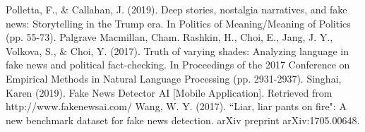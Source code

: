 \documentclass[12pt, final]{article}
\begin{document}
\begin{thebibliography}{1}
     Polletta, F., \& Callahan, J. (2019). Deep stories, nostalgia narratives, and fake news: Storytelling in the Trump era. In Politics of Meaning/Meaning of Politics (pp. 55-73). Palgrave Macmillan, Cham.
     Rashkin, H., Choi, E., Jang, J. Y., Volkova, S., \& Choi, Y. (2017). Truth of varying shades: Analyzing language in fake news and political fact-checking. In Proceedings of the 2017 Conference on Empirical Methods in Natural Language Processing (pp. 2931-2937).
     Singhai, Karen (2019). Fake News Detector AI [Mobile Application]. Retrieved from http://www.fakenewsai.com/
     Wang, W. Y. (2017). ``Liar, liar pants on fire": A new benchmark dataset for fake news detection. arXiv preprint arXiv:1705.00648.
  \end{thebibliography}
\end{document}

